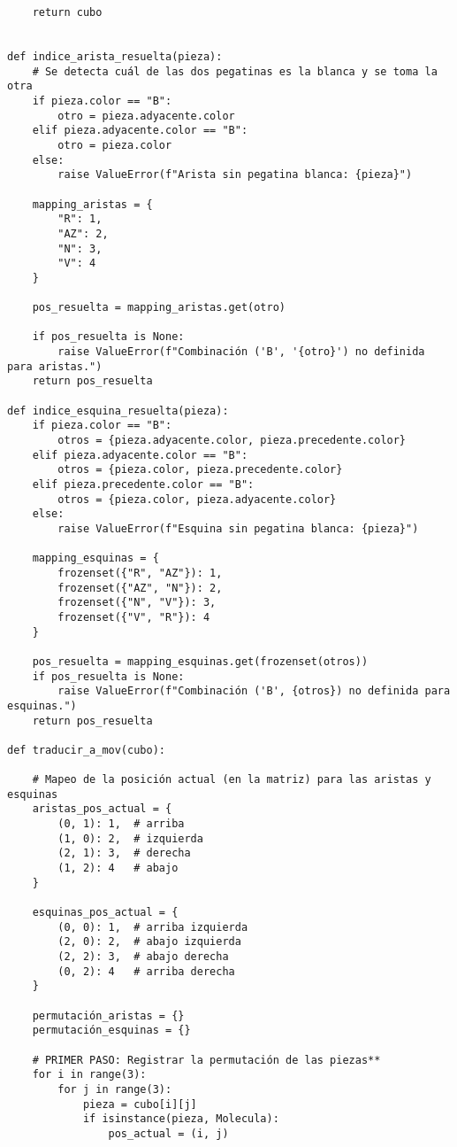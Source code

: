 \begin{lstlisting}
    return cubo


def indice_arista_resuelta(pieza):
    # Se detecta cuál de las dos pegatinas es la blanca y se toma la otra
    if pieza.color == "B":
        otro = pieza.adyacente.color
    elif pieza.adyacente.color == "B":
        otro = pieza.color
    else:
        raise ValueError(f"Arista sin pegatina blanca: {pieza}")
    
    mapping_aristas = {
        "R": 1,
        "AZ": 2,
        "N": 3,
        "V": 4
    }
    
    pos_resuelta = mapping_aristas.get(otro)
    
    if pos_resuelta is None:
        raise ValueError(f"Combinación ('B', '{otro}') no definida para aristas.")
    return pos_resuelta
    
def indice_esquina_resuelta(pieza):
    if pieza.color == "B":
        otros = {pieza.adyacente.color, pieza.precedente.color}
    elif pieza.adyacente.color == "B":
        otros = {pieza.color, pieza.precedente.color}
    elif pieza.precedente.color == "B":
        otros = {pieza.color, pieza.adyacente.color}
    else:
        raise ValueError(f"Esquina sin pegatina blanca: {pieza}")
    
    mapping_esquinas = {
        frozenset({"R", "AZ"}): 1,
        frozenset({"AZ", "N"}): 2,
        frozenset({"N", "V"}): 3,
        frozenset({"V", "R"}): 4
    }
    
    pos_resuelta = mapping_esquinas.get(frozenset(otros))
    if pos_resuelta is None:
        raise ValueError(f"Combinación ('B', {otros}) no definida para esquinas.")
    return pos_resuelta
        
def traducir_a_mov(cubo):
    
    # Mapeo de la posición actual (en la matriz) para las aristas y esquinas
    aristas_pos_actual = {
        (0, 1): 1,  # arriba
        (1, 0): 2,  # izquierda
        (2, 1): 3,  # derecha
        (1, 2): 4   # abajo
    }

    esquinas_pos_actual = {
        (0, 0): 1,  # arriba izquierda
        (2, 0): 2,  # abajo izquierda
        (2, 2): 3,  # abajo derecha
        (0, 2): 4   # arriba derecha
    }
    
    permutación_aristas = {}
    permutación_esquinas = {}

    # PRIMER PASO: Registrar la permutación de las piezas**  
    for i in range(3):
        for j in range(3):
            pieza = cubo[i][j]
            if isinstance(pieza, Molecula):
                pos_actual = (i, j)
                

\end{lstlisting}
